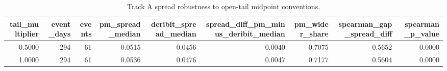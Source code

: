 \begin{table}
\caption{Track A spread robustness to open-tail midpoint conventions.}
\label{tab:trackA_tail_midpoint_robustness}
\begin{tabular}{rrrrrrrrr}
\toprule
tail\_multiplier & event\_days & events & pm\_spread\_median & deribit\_spread\_median & spread\_diff\_pm\_minus\_deribit\_median & pm\_wider\_share & spearman\_gap\_spread\_diff & spearman\_p\_value \\
\midrule
0.5000 & 294 & 61 & 0.0515 & 0.0456 & 0.0040 & 0.7075 & 0.5652 & 0.0000 \\
1.0000 & 294 & 61 & 0.0536 & 0.0476 & 0.0047 & 0.7177 & 0.5604 & 0.0000 \\
\bottomrule
\end{tabular}
\end{table}
